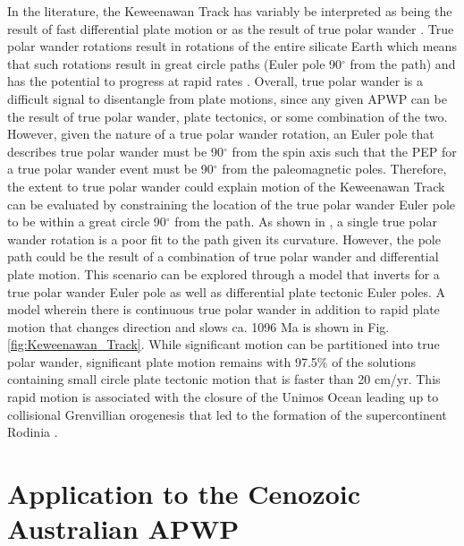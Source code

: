 \documentclass[11pt,letterpaper]{article}
\begin{document}
In the literature, the Keweenawan Track has variably be interpreted as being the result of fast differential plate motion \citep[e.g.][]{Davis1997a} or as the result of true polar wander \citep[e.g.][]{Evans2003a}. True polar wander rotations result in rotations of the entire silicate Earth which means that such rotations result in great circle paths (Euler pole 90$^\circ$ from the path) and has the potential to progress at rapid rates \citep{Rose2017b}. Overall, true polar wander is a difficult signal to disentangle from plate motions, since any given APWP can be the result of true polar wander, plate tectonics, or some combination of the two. However, given the nature of a true polar wander rotation, an Euler pole that describes true polar wander must be 90$^\circ$ from the spin axis such that the PEP for a true polar wander event must be 90$^\circ$ from the paleomagnetic poles. Therefore, the extent to true polar wander could explain motion of the Keweenawan Track can be evaluated by constraining the location of the true polar wander Euler pole to be within a great circle 90$^\circ$ from the path. As shown in \cite{Swanson-Hysell2019a}, a single true polar wander rotation is a poor fit to the path given its curvature. However, the pole path could be the result of a combination of true polar wander and differential plate motion. This scenario can be explored through a model that inverts for a true polar wander Euler pole as well as differential plate tectonic Euler poles. A model wherein there is continuous true polar wander in addition to rapid plate motion that changes direction and slows ca. 1096 Ma is shown in Fig. \ref{fig:Keweenawan_Track}. While significant motion can be partitioned into true polar wander, significant plate motion remains with 97.5$\%$ of the solutions containing small circle plate tectonic motion that is faster than 20 cm/yr. This rapid motion is associated with the closure of the Unimos Ocean leading up to collisional Grenvillian orogenesis that led to the formation of the supercontinent Rodinia \citep{Swanson-Hysell2021d}.

\section*{Application to the Cenozoic Australian APWP}
\label{sec:australia}
\end{document}
